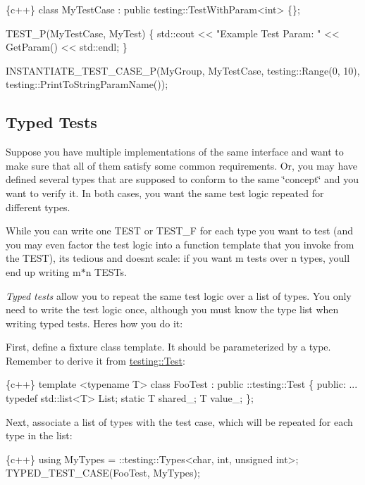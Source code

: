\begin{DoxyCode}
\{c++\}
class MyTestCase : public testing::TestWithParam<int> \{\};

TEST\_P(MyTestCase, MyTest)
\{
  std::cout << "Example Test Param: " << GetParam() << std::endl;
\}

INSTANTIATE\_TEST\_CASE\_P(MyGroup, MyTestCase, testing::Range(0, 10),
                        testing::PrintToStringParamName());
\end{DoxyCode}


\subsection*{Typed Tests}

Suppose you have multiple implementations of the same interface and want to make sure that all of them satisfy some common requirements. Or, you may have defined several types that are supposed to conform to the same \char`\"{}concept\char`\"{} and you want to verify it. In both cases, you want the same test logic repeated for different types.

While you can write one {\ttfamily T\+E\+ST} or {\ttfamily T\+E\+S\+T\+\_\+F} for each type you want to test (and you may even factor the test logic into a function template that you invoke from the {\ttfamily T\+E\+ST}), it\textquotesingle{}s tedious and doesn\textquotesingle{}t scale\+: if you want {\ttfamily m} tests over {\ttfamily n} types, you\textquotesingle{}ll end up writing {\ttfamily m$\ast$n} {\ttfamily T\+E\+ST}s.

{\itshape Typed tests} allow you to repeat the same test logic over a list of types. You only need to write the test logic once, although you must know the type list when writing typed tests. Here\textquotesingle{}s how you do it\+:

First, define a fixture class template. It should be parameterized by a type. Remember to derive it from {\ttfamily \hyperlink{classtesting_1_1Test}{testing\+::\+Test}}\+:


\begin{DoxyCode}
\{c++\}
template <typename T>
class FooTest : public ::testing::Test \{
 public:
  ...
  typedef std::list<T> List;
  static T shared\_;
  T value\_;
\};
\end{DoxyCode}


Next, associate a list of types with the test case, which will be repeated for each type in the list\+:


\begin{DoxyCode}
\{c++\}
using MyTypes = ::testing::Types<char, int, unsigned int>;
TYPED\_TEST\_CASE(FooTest, MyTypes);
\end{DoxyCode}


